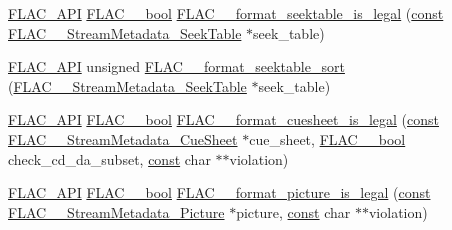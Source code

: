 \begin{DoxyCompactItemize}
\item 
\hyperlink{group__flac__export_ga56ca07df8a23310707732b1c0007d6f5}{F\+L\+A\+C\+\_\+\+A\+PI} \hyperlink{ordinals_8h_a95103469f1cbd78b8cf250194985b34e}{F\+L\+A\+C\+\_\+\+\_\+bool} \hyperlink{group__flac__format_ga02270d9b92dbe7617635c65a1d0f58ff}{F\+L\+A\+C\+\_\+\+\_\+format\+\_\+seektable\+\_\+is\+\_\+legal} (\hyperlink{zconf_8h_a2c212835823e3c54a8ab6d95c652660e}{const} \hyperlink{struct_f_l_a_c_____stream_metadata___seek_table}{F\+L\+A\+C\+\_\+\+\_\+\+Stream\+Metadata\+\_\+\+Seek\+Table} $\ast$seek\+\_\+table)
\item 
\hyperlink{group__flac__export_ga56ca07df8a23310707732b1c0007d6f5}{F\+L\+A\+C\+\_\+\+A\+PI} unsigned \hyperlink{group__flac__format_gad1b0090d45a6d65a696a81261bd7fbf6}{F\+L\+A\+C\+\_\+\+\_\+format\+\_\+seektable\+\_\+sort} (\hyperlink{struct_f_l_a_c_____stream_metadata___seek_table}{F\+L\+A\+C\+\_\+\+\_\+\+Stream\+Metadata\+\_\+\+Seek\+Table} $\ast$seek\+\_\+table)
\item 
\hyperlink{group__flac__export_ga56ca07df8a23310707732b1c0007d6f5}{F\+L\+A\+C\+\_\+\+A\+PI} \hyperlink{ordinals_8h_a95103469f1cbd78b8cf250194985b34e}{F\+L\+A\+C\+\_\+\+\_\+bool} \hyperlink{group__flac__format_gae922cabe2dc3f81af10cb635cf996114}{F\+L\+A\+C\+\_\+\+\_\+format\+\_\+cuesheet\+\_\+is\+\_\+legal} (\hyperlink{zconf_8h_a2c212835823e3c54a8ab6d95c652660e}{const} \hyperlink{struct_f_l_a_c_____stream_metadata___cue_sheet}{F\+L\+A\+C\+\_\+\+\_\+\+Stream\+Metadata\+\_\+\+Cue\+Sheet} $\ast$cue\+\_\+sheet, \hyperlink{ordinals_8h_a95103469f1cbd78b8cf250194985b34e}{F\+L\+A\+C\+\_\+\+\_\+bool} check\+\_\+cd\+\_\+da\+\_\+subset, \hyperlink{zconf_8h_a2c212835823e3c54a8ab6d95c652660e}{const} char $\ast$$\ast$violation)
\item 
\hyperlink{group__flac__export_ga56ca07df8a23310707732b1c0007d6f5}{F\+L\+A\+C\+\_\+\+A\+PI} \hyperlink{ordinals_8h_a95103469f1cbd78b8cf250194985b34e}{F\+L\+A\+C\+\_\+\+\_\+bool} \hyperlink{group__flac__format_gaf90af7bc6ece6f28063b08e9aa6b4077}{F\+L\+A\+C\+\_\+\+\_\+format\+\_\+picture\+\_\+is\+\_\+legal} (\hyperlink{zconf_8h_a2c212835823e3c54a8ab6d95c652660e}{const} \hyperlink{struct_f_l_a_c_____stream_metadata___picture}{F\+L\+A\+C\+\_\+\+\_\+\+Stream\+Metadata\+\_\+\+Picture} $\ast$picture, \hyperlink{zconf_8h_a2c212835823e3c54a8ab6d95c652660e}{const} char $\ast$$\ast$violation)
\end{DoxyCompactItemize}
